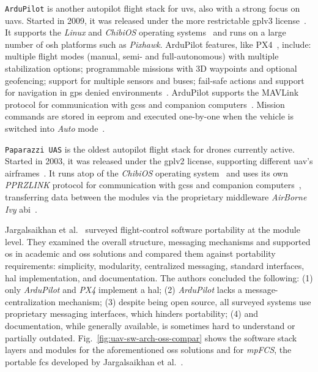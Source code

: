 %
\lstinline{ArduPilot} is another autopilot flight stack for \glspl{uv}, also with a strong focus
on \glspl{uav}. Started in 2009, it was released under the more restrictable
\gls{gpl}v3 license~\cite{arduPilotHistory}. It supports the \emph{Linux} and
\emph{ChibiOS} operating
systems~\cite{arduPilot-github,jargalsaikhan2022architectural} and runs on a large number of
\gls{osh} platforms such as \emph{Pixhawk}.
%
ArduPilot features, like PX4~\cite{px4-features}, include:
multiple flight modes (manual, semi- and full-autonomous) with multiple
stabilization options; programmable missions with 3D waypoints and optional
geofencing; support for multiple sensors and buses; fail-safe actions and
support for navigation in \gls{gps} denied environments~\cite{arduPilot-home}.
%
ArduPilot supports the MAVLink protocol for communication with
\glspl{gcs} and companion computers~\cite{arduPilot-home}. Mission commands are
stored in \gls{eeprom} and executed one-by-one when the vehicle is switched into
\emph{Auto} mode~\cite{ardupilot-mavlink}.

%
\lstinline{Paparazzi UAS} is the oldest autopilot flight stack for drones
currently active. Started in 2003, it was released under the \gls{gpl}v2
license, supporting different \gls{uav}'s airframes~\cite{paparazzi-home}.
It runs atop of the \emph{ChibiOS} operating
system~\cite{paparazzi-sysOverv} and uses its own \emph{PPRZLINK} protocol for communication
with \glspl{gcs} and companion computers~\cite{paparazzi-sysOverv}, transferring
data between the modules via the proprietary middleware \emph{AirBorne Ivy} \gls{abi}~\cite{jargalsaikhan2022architectural}.

Jargalsaikhan et al.~\cite{jargalsaikhan2022architectural} surveyed
flight-control software portability at the module level. They examined the
overall structure, messaging mechanisms and supported \gls{os} in academic and \gls{oss} solutions and compared them against portability requirements:
simplicity, modularity, centralized messaging, standard interfaces, \gls{hal}
implementation, and documentation. The authors concluded the following: (1) only
\emph{ArduPilot} and \emph{PX4} implement a \gls{hal}; (2) \emph{ArduPilot}
lacks a message-centralization mechanism; (3) despite being open source, all
surveyed systems use proprietary messaging interfaces, which hinders
portability; (4) and documentation, while generally available, is sometimes hard
to understand or partially outdated. Fig.~\ref{fig:uav-sw-arch-oss-compar} shows the software
stack layers and modules for the aforementioned \gls{oss} solutions and for
\emph{mpFCS}, the portable \gls{fcs} developed by Jargalsaikhan et
al.~\cite{jargalsaikhan2022architectural}.


